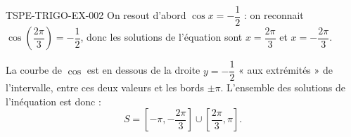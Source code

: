 \begin{corrige}{TSPE-TRIGO-EX-002}
On resout d'abord $\cos x = -\dfrac{1}{2}$ : on reconnait $\cos\!\left(\dfrac{2\pi}{3}\right) = -\dfrac{1}{2}$, donc les solutions de l'équation sont $x = \dfrac{2\pi}{3}$ et $x = -\dfrac{2\pi}{3}$.

La courbe de $\cos$ est en dessous de la droite $y=-\dfrac{1}{2}$ « aux extrémités » de l'intervalle, entre ces deux valeurs et les bords $\pm\pi$. L'ensemble des solutions de l'inéquation est donc :
\[
  \boxed{S = \left[-\pi, -\dfrac{2\pi}{3}\right] \cup \left[\dfrac{2\pi}{3}, \pi\right]}.
\]
\end{corrige}
